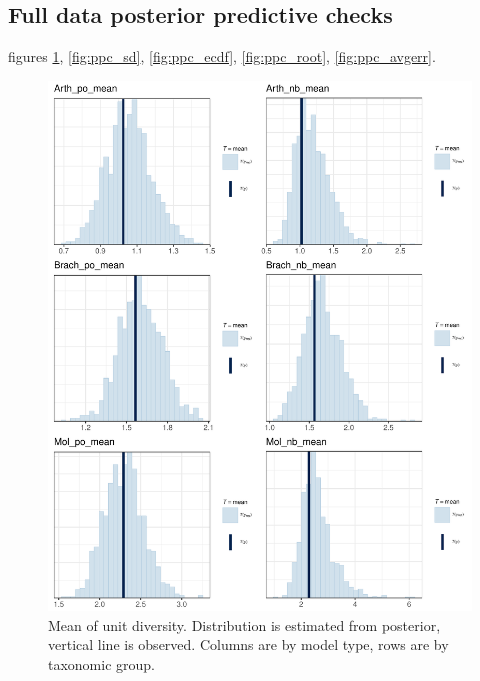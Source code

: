 \documentclass[12pt,letterpaper]{article}
\begin{document}
\subsection{Full data posterior predictive checks}
figures \ref{fig:ppc_mean}, \ref{fig:ppc_sd}, \ref{fig:ppc_ecdf}, \ref{fig:ppc_root}, \ref{fig:ppc_avgerr}.

\afterpage{\clearpage}
\begin{figure}[h]
  \centering
  \includegraphics[width=\textwidth,height=0.8\textheight,keepaspectratio=true]{figure/ppc_mean}
  \caption{Mean of unit diversity. Distribution is estimated from posterior, vertical line is observed. Columns are by model type, rows are by taxonomic group.}
  \label{fig:ppc_mean}
\end{figure}
\end{document}
